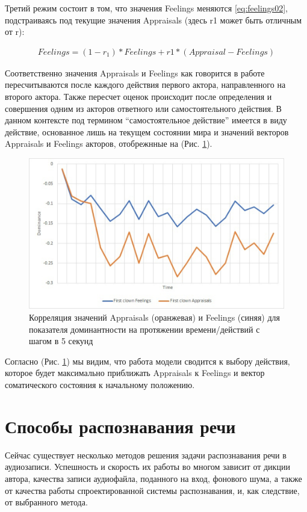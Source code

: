 Третий режим состоит в том, что значения Feelings меняются \ref{eq:feelings02}, подстраиваясь под текущие значения Appraisals (здесь r1 может быть отличным от r): 

\begin{equation}
  \begin{gathered}
    Feelings=(1-r_1 )*Feelings+r1*(Appraisal-Feelings)
  \end{gathered}
  \label{eq:feelings02}
\end{equation}

Соответственно значения Appraisals и Feelings как говорится в работе \cite{Samsonovich05} пересчитываются после каждого действия первого актора, направленного на второго актора.
Также пересчет оценок происходит после определения и совершения одним из акторов ответного или самостоятельного действия. 
В данном контексте под термином “самостоятельное действие” имеется в виду действие, основанное лишь на текущем состоянии мира и 
значений векторов Appraisals и Feelings акторов, отобрежнные на (Рис. \ref{pic:ris8}). 


\begin{figure}[h]
\includegraphics[width=0.75\columnwidth]{./img/ris8.png}
\centering
\caption{Корреляция значений Appraisals (оранжевая) и Feelings (синяя) для показателя доминантности на протяжении времени/действий с шагом в 5 секунд}
\label{pic:ris8}
\end{figure}

Согласно (Рис. \ref{pic:ris8}) мы видим, что работа модели сводится к выбору действия, 
которое будет максимально приближать Appraisals к Feelings и вектор соматического состояния к начальному положению.

\section{Способы распознавания речи}
Сейчас существует несколько методов решения задачи распознавания речи в аудиозаписи. Успешность и скорость их работы во многом зависит от дикции автора, качества записи аудиофайла, поданного на вход, фонового шума, а также от качества работы спроектированной системы распознавания, и, как следствие, от выбранного метода.

